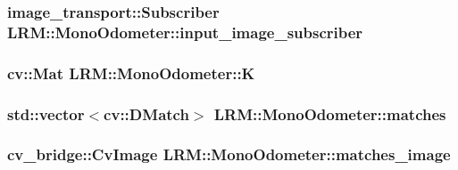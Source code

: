 \hypertarget{classLRM_1_1MonoOdometer_ad191c12993c8e8ee9200f71aec07057c}{
\subsubsection[{input\-\_\-image\-\_\-subscriber}]{\setlength{\rightskip}{0pt plus 5cm}image\-\_\-transport\-::\-Subscriber {\bf \-L\-R\-M\-::\-Mono\-Odometer\-::input\-\_\-image\-\_\-subscriber}}}\label{classLRM_1_1MonoOdometer_ad191c12993c8e8ee9200f71aec07057c}
\hypertarget{classLRM_1_1MonoOdometer_a7f874bb9b174d7a38085782377d5f195}{
\subsubsection[{\-K}]{\setlength{\rightskip}{0pt plus 5cm}cv\-::\-Mat {\bf \-L\-R\-M\-::\-Mono\-Odometer\-::\-K}}}\label{classLRM_1_1MonoOdometer_a7f874bb9b174d7a38085782377d5f195}
\hypertarget{classLRM_1_1MonoOdometer_aefc5720615c86208707622253d2e08ed}{
\subsubsection[{matches}]{\setlength{\rightskip}{0pt plus 5cm}std\-::vector$<$cv\-::\-D\-Match$>$ {\bf \-L\-R\-M\-::\-Mono\-Odometer\-::matches}}}\label{classLRM_1_1MonoOdometer_aefc5720615c86208707622253d2e08ed}
\hypertarget{classLRM_1_1MonoOdometer_a1646743b51e5e0386def055e0265aaf2}{
\subsubsection[{matches\-\_\-image}]{\setlength{\rightskip}{0pt plus 5cm}cv\-\_\-bridge\-::\-Cv\-Image {\bf \-L\-R\-M\-::\-Mono\-Odometer\-::matches\-\_\-image}}}\label{classLRM_1_1MonoOdometer_a1646743b51e5e0386def055e0265aaf2}
